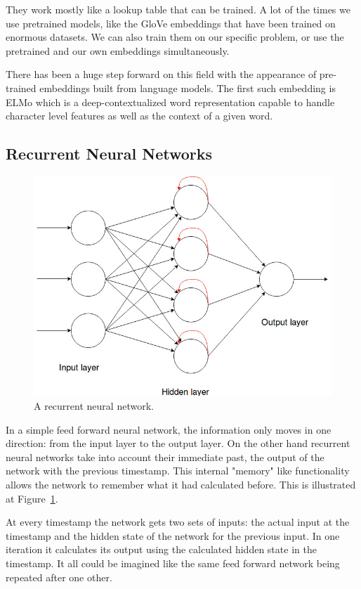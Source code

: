 They work mostly like a lookup table that can be trained. A lot of the times we use pretrained models, like the GloVe embeddings that have been trained on enormous datasets. We can also train them on our specific problem, or use the pretrained and our own embeddings simultaneously.

There has been a huge step forward on this field with the appearance of pre-trained embeddings built from language models. The first such embedding is ELMo \cite{ELMo} which is a deep-contextualized word representation capable to handle character level features as well as the context of a given word.

\subsection{Recurrent Neural Networks}

\begin{figure}[!ht]
	\centering
	\includegraphics[width=125mm, keepaspectratio]{figures/recurrent_neural_network.jpg}
	\caption{A recurrent neural network.}
	\label{fig:recurrent_net}
\end{figure}

In a simple feed forward neural network, the information only moves in one direction: from the input layer to the output layer. On the other hand recurrent neural networks take into account their immediate past, the output of the network with the previous timestamp. This internal "memory" like functionality allows the network to remember what it had calculated before. This is illustrated at Figure~\ref{fig:recurrent_net}.

At every timestamp the network gets two sets of inputs: the actual input at the timestamp and the hidden state of the network for the previous input. In one iteration it calculates its output using the calculated hidden state in the timestamp. It all could be imagined like the same feed forward network being repeated after one other.

